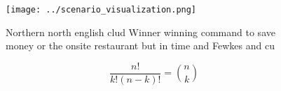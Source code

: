 \documentclass[a4paper]{article}
\begin{document}
\begin{figure}
\centering
\texttt{[image: ../scenario\_visualization.png]}
\caption{Northern north english clud Winner winning command to save money or the onsite restaurant but in time and Fewkes and cu
}
\end{figure}
 
\[ \frac{n!}{k!(n-k)!} = \binom{n}{k} \]
\end{document}
